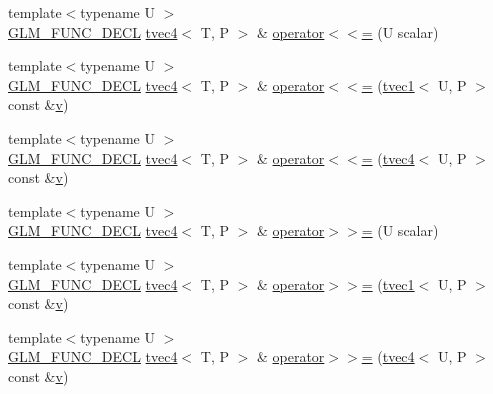 \begin{DoxyCompactItemize}
\item 
{\footnotesize template$<$typename U $>$ }\\\mbox{\hyperlink{setup_8hpp_ab2d052de21a70539923e9bcbf6e83a51}{G\+L\+M\+\_\+\+F\+U\+N\+C\+\_\+\+D\+E\+CL}} \mbox{\hyperlink{structglm_1_1tvec4}{tvec4}}$<$ T, P $>$ \& \mbox{\hyperlink{structglm_1_1tvec4_a7896c5f2fbb9692e18f145fef2482677}{operator$<$$<$=}} (U scalar)
\item 
{\footnotesize template$<$typename U $>$ }\\\mbox{\hyperlink{setup_8hpp_ab2d052de21a70539923e9bcbf6e83a51}{G\+L\+M\+\_\+\+F\+U\+N\+C\+\_\+\+D\+E\+CL}} \mbox{\hyperlink{structglm_1_1tvec4}{tvec4}}$<$ T, P $>$ \& \mbox{\hyperlink{structglm_1_1tvec4_a499b2a24166487f91833e1f6b19aa972}{operator$<$$<$=}} (\mbox{\hyperlink{structglm_1_1tvec1}{tvec1}}$<$ U, P $>$ const \&\mbox{\hyperlink{glad_8h_a14cfbe2fc2234f5504618905b69d1e06}{v}})
\item 
{\footnotesize template$<$typename U $>$ }\\\mbox{\hyperlink{setup_8hpp_ab2d052de21a70539923e9bcbf6e83a51}{G\+L\+M\+\_\+\+F\+U\+N\+C\+\_\+\+D\+E\+CL}} \mbox{\hyperlink{structglm_1_1tvec4}{tvec4}}$<$ T, P $>$ \& \mbox{\hyperlink{structglm_1_1tvec4_ae46c24a5c1f5c2bcbcb9f4d9c767778e}{operator$<$$<$=}} (\mbox{\hyperlink{structglm_1_1tvec4}{tvec4}}$<$ U, P $>$ const \&\mbox{\hyperlink{glad_8h_a14cfbe2fc2234f5504618905b69d1e06}{v}})
\item 
{\footnotesize template$<$typename U $>$ }\\\mbox{\hyperlink{setup_8hpp_ab2d052de21a70539923e9bcbf6e83a51}{G\+L\+M\+\_\+\+F\+U\+N\+C\+\_\+\+D\+E\+CL}} \mbox{\hyperlink{structglm_1_1tvec4}{tvec4}}$<$ T, P $>$ \& \mbox{\hyperlink{structglm_1_1tvec4_a6864c1240c7b96bc2ece0dca52eeaa78}{operator$>$$>$=}} (U scalar)
\item 
{\footnotesize template$<$typename U $>$ }\\\mbox{\hyperlink{setup_8hpp_ab2d052de21a70539923e9bcbf6e83a51}{G\+L\+M\+\_\+\+F\+U\+N\+C\+\_\+\+D\+E\+CL}} \mbox{\hyperlink{structglm_1_1tvec4}{tvec4}}$<$ T, P $>$ \& \mbox{\hyperlink{structglm_1_1tvec4_a941c7db66248a949a46e398b8f9f15ce}{operator$>$$>$=}} (\mbox{\hyperlink{structglm_1_1tvec1}{tvec1}}$<$ U, P $>$ const \&\mbox{\hyperlink{glad_8h_a14cfbe2fc2234f5504618905b69d1e06}{v}})
\item 
{\footnotesize template$<$typename U $>$ }\\\mbox{\hyperlink{setup_8hpp_ab2d052de21a70539923e9bcbf6e83a51}{G\+L\+M\+\_\+\+F\+U\+N\+C\+\_\+\+D\+E\+CL}} \mbox{\hyperlink{structglm_1_1tvec4}{tvec4}}$<$ T, P $>$ \& \mbox{\hyperlink{structglm_1_1tvec4_a36837fd895234f73e2e76aedb39712b2}{operator$>$$>$=}} (\mbox{\hyperlink{structglm_1_1tvec4}{tvec4}}$<$ U, P $>$ const \&\mbox{\hyperlink{glad_8h_a14cfbe2fc2234f5504618905b69d1e06}{v}})

\end{DoxyCompactItemize}

